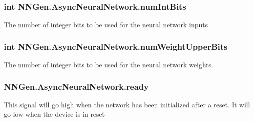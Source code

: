\subsubsection[{num\+Int\+Bits}]{\setlength{\rightskip}{0pt plus 5cm}int N\+N\+Gen.\+Async\+Neural\+Network.\+num\+Int\+Bits\hspace{0.3cm}{\ttfamily [get]}}\label{class_n_n_gen_1_1_async_neural_network_aa792285911d8e4b6d402451efe7d57c2}


The number of integer bits to be used for the neural network inputs 

\hypertarget{class_n_n_gen_1_1_async_neural_network_a098bee8b58e461ea1141e5a2c165ee88}{}
\subsubsection[{num\+Weight\+Upper\+Bits}]{\setlength{\rightskip}{0pt plus 5cm}int N\+N\+Gen.\+Async\+Neural\+Network.\+num\+Weight\+Upper\+Bits\hspace{0.3cm}{\ttfamily [get]}}\label{class_n_n_gen_1_1_async_neural_network_a098bee8b58e461ea1141e5a2c165ee88}


The number of integer bits to be used for the neural network weights. 

\hypertarget{class_n_n_gen_1_1_async_neural_network_a30cb0df931a8da4dd7e911f953caaf02}{}
\subsubsection[{ready}]{ N\+N\+Gen.\+Async\+Neural\+Network.\+ready\hspace{0.3cm}{\ttfamily [get]}}\label{class_n_n_gen_1_1_async_neural_network_a30cb0df931a8da4dd7e911f953caaf02}


This signal will go high when the network has been initialized after a reset. It will go low when the device is in reset 

\hypertarget{class_n_n_gen_1_1_async_neural_network_ade446cacb56d0ddf2aae1510e2425591}{}
